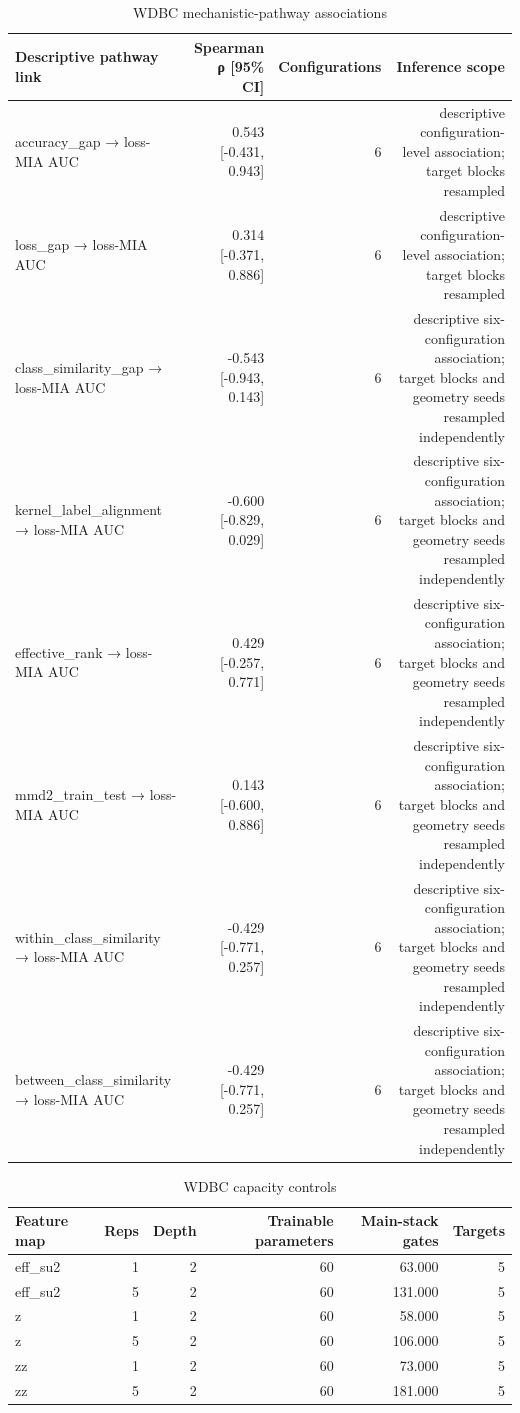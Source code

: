 \begin{table}
\caption{WDBC mechanistic-pathway associations}
\label{tab:satml_wdbc_pathway}
\begin{tabular}{lrrr}
\toprule
Descriptive pathway link & Spearman ρ [95\% CI] & Configurations & Inference scope \\
\midrule
accuracy\_gap → loss-MIA AUC & 0.543 [-0.431, 0.943] & 6 & descriptive configuration-level association; target blocks resampled \\
loss\_gap → loss-MIA AUC & 0.314 [-0.371, 0.886] & 6 & descriptive configuration-level association; target blocks resampled \\
class\_similarity\_gap → loss-MIA AUC & -0.543 [-0.943, 0.143] & 6 & descriptive six-configuration association; target blocks and geometry seeds resampled independently \\
kernel\_label\_alignment → loss-MIA AUC & -0.600 [-0.829, 0.029] & 6 & descriptive six-configuration association; target blocks and geometry seeds resampled independently \\
effective\_rank → loss-MIA AUC & 0.429 [-0.257, 0.771] & 6 & descriptive six-configuration association; target blocks and geometry seeds resampled independently \\
mmd2\_train\_test → loss-MIA AUC & 0.143 [-0.600, 0.886] & 6 & descriptive six-configuration association; target blocks and geometry seeds resampled independently \\
within\_class\_similarity → loss-MIA AUC & -0.429 [-0.771, 0.257] & 6 & descriptive six-configuration association; target blocks and geometry seeds resampled independently \\
between\_class\_similarity → loss-MIA AUC & -0.429 [-0.771, 0.257] & 6 & descriptive six-configuration association; target blocks and geometry seeds resampled independently \\
\bottomrule
\end{tabular}
\end{table}


\begin{table}
\caption{WDBC capacity controls}
\label{tab:satml_wdbc_capacity}
\begin{tabular}{lrrrrr}
\toprule
Feature map & Reps & Depth & Trainable parameters & Main-stack gates & Targets \\
\midrule
eff\_su2 & 1 & 2 & 60 & 63.000 & 5 \\
eff\_su2 & 5 & 2 & 60 & 131.000 & 5 \\
z & 1 & 2 & 60 & 58.000 & 5 \\
z & 5 & 2 & 60 & 106.000 & 5 \\
zz & 1 & 2 & 60 & 73.000 & 5 \\
zz & 5 & 2 & 60 & 181.000 & 5 \\
\bottomrule
\end{tabular}
\end{table}

